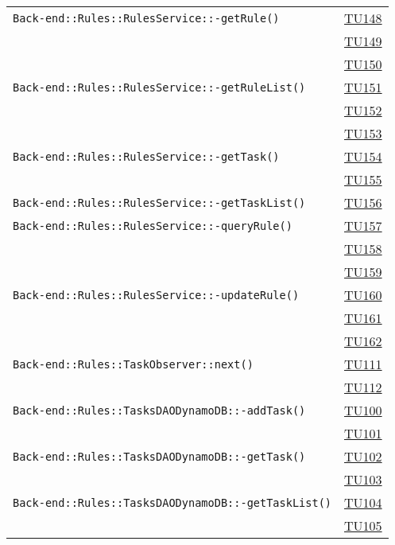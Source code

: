 \begin{longtable}{|>{\centering}m{12cm}|m{1cm}<{\centering}|}
\texttt{Back-end::Rules::RulesService::-\linebreak getRule()} & \hyperlink{TU148}{TU148}\\ & \hyperlink{TU149}{TU149}\\ & \hyperlink{TU150}{TU150}\\ \hline
\texttt{Back-end::Rules::RulesService::-\linebreak getRuleList()} & \hyperlink{TU151}{TU151}\\ & \hyperlink{TU152}{TU152}\\ & \hyperlink{TU153}{TU153}\\ \hline
\texttt{Back-end::Rules::RulesService::-\linebreak getTask()} & \hyperlink{TU154}{TU154}\\ & \hyperlink{TU155}{TU155}\\ \hline
\texttt{Back-end::Rules::RulesService::-\linebreak getTaskList()} & \hyperlink{TU156}{TU156}\\ \hline
\texttt{Back-end::Rules::RulesService::-\linebreak queryRule()} & \hyperlink{TU157}{TU157}\\ & \hyperlink{TU158}{TU158}\\ & \hyperlink{TU159}{TU159}\\ \hline
\texttt{Back-end::Rules::RulesService::-\linebreak updateRule()} & \hyperlink{TU160}{TU160}\\ & \hyperlink{TU161}{TU161}\\ & \hyperlink{TU162}{TU162}\\ \hline
\texttt{Back-end::Rules::TaskObserver::next()} & \hyperlink{TU111}{TU111}\\ & \hyperlink{TU112}{TU112}\\ \hline
\texttt{Back-end::Rules::TasksDAODynamoDB::-\linebreak addTask()} & \hyperlink{TU100}{TU100}\\ & \hyperlink{TU101}{TU101}\\ \hline
\texttt{Back-end::Rules::TasksDAODynamoDB::-\linebreak getTask()} & \hyperlink{TU102}{TU102}\\ & \hyperlink{TU103}{TU103}\\ \hline
\texttt{Back-end::Rules::TasksDAODynamoDB::-\linebreak getTaskList()} & \hyperlink{TU104}{TU104}\\ & \hyperlink{TU105}{TU105}\\ \hline

\end{longtable}
